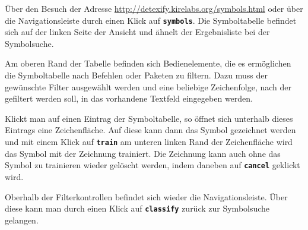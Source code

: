 Über den Besuch der Adresse \url{http://detexify.kirelabs.org/symbols.html} oder über die Navigationsleiste durch einen Klick auf \textbf{\texttt{symbols}}. Die Symboltabelle befindet sich auf der linken Seite der Ansicht und ähnelt der Ergebnisliste bei der Symbolsuche.

Am oberen Rand der Tabelle befinden sich Bedienelemente, die es ermöglichen die Symboltabelle nach Befehlen oder Paketen zu filtern. Dazu muss der gewünschte Filter ausgewählt werden und eine beliebige Zeichenfolge, nach der gefiltert werden soll, in das vorhandene Textfeld eingegeben werden.

Klickt man auf einen Eintrag der Symboltabelle, so öffnet sich unterhalb dieses Eintrags eine Zeichenfläche. Auf diese kann dann das Symbol gezeichnet werden und mit einem Klick auf \textbf{\texttt{train}} am unteren linken Rand der Zeichenfläche wird das Symbol mit der Zeichnung trainiert. Die Zeichnung kann auch ohne das Symbol zu trainieren wieder gelöscht werden, indem daneben auf \textbf{\texttt{cancel}} geklickt wird.

Oberhalb der Filterkontrollen befindet sich wieder die Navigationsleiste. Über diese kann man durch einen Klick auf \textbf{\texttt{classify}} zurück zur Symbolsuche gelangen.



